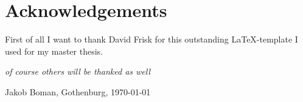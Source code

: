 \thispagestyle{plain}			%
\section*{Acknowledgements}

First of all I want to thank David Frisk for this outstanding \LaTeX-template I used for my master thesis.

\textit{of course others will be thanked as well}

\vspace{1.5cm}
\hfill
Jakob Boman, Gothenburg, \today

\newpage				%
\thispagestyle{empty}
\mbox{}